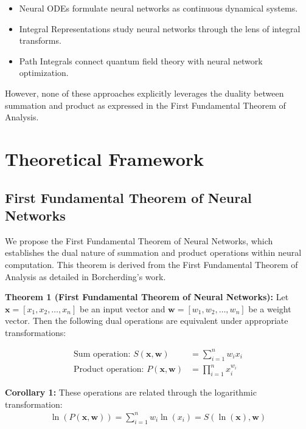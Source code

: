 \documentclass{article}
\begin{document}
\begin{itemize}
    \item Neural ODEs \cite{chen2018neural} formulate neural networks as continuous dynamical systems.
    
    \item Integral Representations \cite{williams1995theoretical} study neural networks through the lens of integral transforms.
    
    \item Path Integrals \cite{gonçalves2022path} connect quantum field theory with neural network optimization.
\end{itemize}

However, none of these approaches explicitly leverages the duality between summation and product as expressed in the First Fundamental Theorem of Analysis.

\section{Theoretical Framework}

\subsection{First Fundamental Theorem of Neural Networks}

We propose the First Fundamental Theorem of Neural Networks, which establishes the dual nature of summation and product operations within neural computation. This theorem is derived from the First Fundamental Theorem of Analysis as detailed in Borcherding's work.

\textbf{Theorem 1 (First Fundamental Theorem of Neural Networks):} Let $\mathbf{x} = [x_1, x_2, \ldots, x_n]$ be an input vector and $\mathbf{w} = [w_1, w_2, \ldots, w_n]$ be a weight vector. Then the following dual operations are equivalent under appropriate transformations:

\begin{align}
\text{Sum operation: } S(\mathbf{x}, \mathbf{w}) &= \sum_{i=1}^{n} w_i x_i \\
\text{Product operation: } P(\mathbf{x}, \mathbf{w}) &= \prod_{i=1}^{n} x_i^{w_i}
\end{align}

\textbf{Corollary 1:} These operations are related through the logarithmic transformation:
\begin{align}
\ln(P(\mathbf{x}, \mathbf{w})) = \sum_{i=1}^{n} w_i \ln(x_i) = S(\ln(\mathbf{x}), \mathbf{w})
\end{align}
\end{document}
